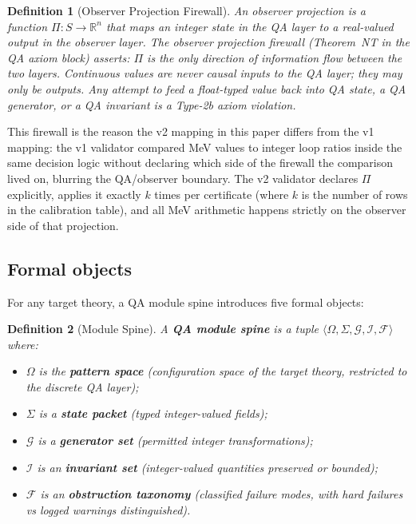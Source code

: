 \documentclass[12pt,a4paper]{article}
\newtheorem{definition}{Definition}
\begin{document}
\begin{definition}[Observer Projection Firewall]
An observer projection is a function $\Pi: S \to \mathbb{R}^n$ that maps
an integer state in the QA layer to a real-valued output in the observer
layer. The \emph{observer projection firewall} (Theorem~NT in the QA
axiom block) asserts: $\Pi$ is the \emph{only} direction of information
flow between the two layers. Continuous values are never causal inputs
to the QA layer; they may only be outputs. Any attempt to feed a
float-typed value back into QA state, a QA generator, or a QA invariant
is a Type-2b axiom violation.
\end{definition}

This firewall is the reason the v2 mapping in this paper differs from
the v1 mapping: the v1 validator compared MeV values to integer loop
ratios inside the same decision logic without declaring which side of
the firewall the comparison lived on, blurring the QA/observer
boundary. The v2 validator declares $\Pi$ explicitly, applies it
exactly $k$ times per certificate (where $k$ is the number of rows in
the calibration table), and all MeV arithmetic happens strictly on the
observer side of that projection.

\subsection{Formal objects}

For any target theory, a QA module spine introduces five formal objects:

\begin{definition}[Module Spine]
A \textbf{QA module spine} is a tuple
$\langle \Omega, \Sigma, \mathcal{G}, \mathcal{I}, \mathcal{F} \rangle$
where:
\begin{itemize}[nosep]
  \item $\Omega$ is the \textbf{pattern space} (configuration space of the
        target theory, restricted to the discrete QA layer);
  \item $\Sigma$ is a \textbf{state packet} (typed integer-valued fields);
  \item $\mathcal{G}$ is a \textbf{generator set} (permitted integer
        transformations);
  \item $\mathcal{I}$ is an \textbf{invariant set} (integer-valued
        quantities preserved or bounded);
  \item $\mathcal{F}$ is an \textbf{obstruction taxonomy} (classified
        failure modes, with hard failures vs logged warnings distinguished).
\end{itemize}
\end{definition}
\end{document}
